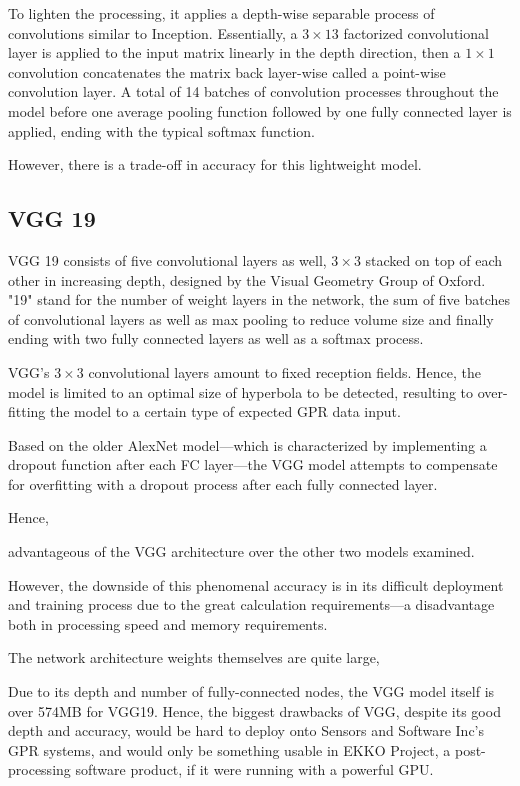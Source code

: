\documentclass[se,blockletter]{uw-wkrpt}
\begin{document}
To lighten the processing, it applies a depth-wise separable process of convolutions similar to Inception. Essentially, a $3 \times 13$ factorized convolutional layer is applied to the input matrix linearly in the depth direction, then a $1 \times 1$ convolution concatenates the matrix back layer-wise called a point-wise convolution layer. A total of 14 batches of convolution processes throughout the model before one average pooling function followed by one fully connected layer is applied, ending with the typical softmax function.

However, there is a trade-off in accuracy for this lightweight model.  


\subsection{VGG 19}
VGG 19 consists of five convolutional layers as well, $3 \times 3$ stacked on top of each other in increasing depth, designed by the Visual Geometry Group of Oxford. "19" stand for the number of weight layers in the network, the sum of five batches of convolutional layers as well as max pooling to reduce volume size and finally ending with two fully connected layers as well as a softmax process.

VGG's $3 \times 3$ convolutional layers amount to fixed reception fields. Hence, the model is limited to an optimal size of hyperbola to be detected, resulting to over-fitting the model to a certain type of expected GPR data input. 

Based on the older AlexNet model---which is characterized by implementing a dropout function after each FC layer---the VGG model attempts to compensate for overfitting with a dropout process after each fully connected layer. 


Hence, 

advantageous of the VGG architecture over the other two models examined. 

However, the downside of this phenomenal accuracy is in its difficult deployment and training process due to the great calculation requirements---a disadvantage both in processing speed and memory requirements. 

The network architecture weights themselves are quite large,

Due to its depth and number of fully-connected nodes, the VGG model itself is over 574MB for VGG19. Hence, the biggest drawbacks of VGG, despite its good depth and accuracy, would be hard to deploy onto Sensors and Software Inc’s GPR systems, and would only be something usable in EKKO Project, a post-processing software product, if it were running with a powerful GPU. 
\end{document}
